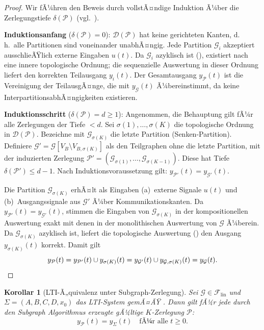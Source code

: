 ﻿\documentclass[12pt,a4paper]{article}
\newtheorem{korollar}[theorem]{Korollar}
\theoremstyle{definition}
\begin{document}
\begin{proof}
Wir fÃ¼hren den Beweis durch vollstÃ¤ndige Induktion Ã¼ber die Zerlegungstiefe
$\delta(\mathcal{P})$ (vgl.\ ).

\medskip
\textbf{Induktionsanfang} ($\delta(\mathcal{P}) = 0$):
$\mathcal{D}(\mathcal{P})$ hat keine gerichteten Kanten, d.\,h.\ alle
Partitionen sind voneinander unabhÃ¤ngig. Jede Partition $\mathcal{G}_i$
akzeptiert ausschlieÃŸlich externe Eingaben $u(t)$. Da $\mathcal{G}_i$
azyklisch ist (), existiert nach  eine
innere topologische Ordnung; die sequenzielle Auswertung in dieser
Ordnung liefert den korrekten Teilausgang $y_i(t)$. Der Gesamtausgang
$y_{\mathcal{P}}(t)$ ist die Vereinigung der TeilausgÃ¤nge, die mit
$y_{\mathcal{G}}(t)$ Ã¼bereinstimmt, da keine InterpartitionsabhÃ¤ngigkeiten
existieren.

\medskip
\textbf{Induktionsschritt} ($\delta(\mathcal{P}) = d \geq 1$):
Angenommen, die Behauptung gilt fÃ¼r alle Zerlegungen der Tiefe $< d$.
Sei $\sigma(1), \ldots, \sigma(K)$ die topologische Ordnung in
$\mathcal{D}(\mathcal{P})$. Bezeichne mit $\mathcal{G}_{\sigma(K)}$ die
letzte Partition (Senken-Partition). Definiere
$\mathcal{G}' = \mathcal{G}[V_B \setminus V_{B,\sigma(K)}]$ als den
Teilgraphen ohne die letzte Partition, mit der induzierten Zerlegung
$\mathcal{P}' = (\mathcal{G}_{\sigma(1)}, \ldots, \mathcal{G}_{\sigma(K-1)})$.
Diese hat Tiefe $\delta(\mathcal{P}') \leq d - 1$.
Nach Induktionsvoraussetzung gilt: $y_{\mathcal{P}'}(t) = y_{\mathcal{G}'}(t)$.

Die Partition $\mathcal{G}_{\sigma(K)}$ erhÃ¤lt als Eingaben
(a)~externe Signale $u(t)$ und
(b)~Ausgangssignale aus $\mathcal{G}'$ Ã¼ber Kommunikationskanten.
Da $y_{\mathcal{P}'}(t) = y_{\mathcal{G}'}(t)$, stimmen die Eingaben von
$\mathcal{G}_{\sigma(K)}$ in der kompositionellen Auswertung exakt mit
denen in der monolithischen Auswertung von $\mathcal{G}$ Ã¼berein.
Da $\mathcal{G}_{\sigma(K)}$ azyklisch ist, liefert die topologische
Auswertung () den Ausgang $y_{\sigma(K)}(t)$ korrekt.
Damit gilt
\[
  y_{\mathcal{P}}(t)
  = y_{\mathcal{P}'}(t) \cup y_{\sigma(K)}(t)
  = y_{\mathcal{G}'}(t) \cup y_{\mathcal{G},\sigma(K)}(t)
  = y_{\mathcal{G}}(t). \qedhere
\]
\end{proof}

\begin{korollar}[LTI-Ã„quivalenz unter Subgraph-Zerlegung]
\label{kor:lti-subgraph}
Sei $\mathcal{G} \in \mathcal{F}_{\mathrm{lin}}$ und
$\Sigma = (A, B, C, D, x_0)$ das LTI-System gemÃ¤ÃŸ .
Dann gilt fÃ¼r jede durch den Subgraph Algorithmus erzeugte gÃ¼ltige
$K$-Zerlegung $\mathcal{P}$:
\[
  y_{\mathcal{P}}(t) = y_{\Sigma}(t) \quad \text{fÃ¼r alle } t \geq 0.
\]
\end{korollar}
\end{document}

